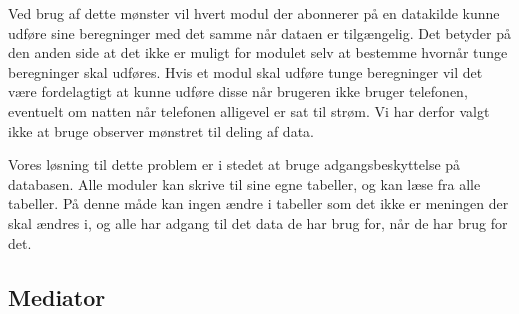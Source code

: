 Ved brug af dette mønster vil hvert modul der abonnerer på en datakilde kunne udføre sine beregninger med det samme når dataen er tilgængelig.
Det betyder på den anden side at det ikke er muligt for modulet selv at bestemme hvornår tunge beregninger skal udføres.
Hvis et modul skal udføre tunge beregninger vil det være fordelagtigt at kunne udføre disse når brugeren ikke bruger telefonen, eventuelt om natten når telefonen alligevel er sat til strøm.
Vi har derfor valgt ikke at bruge observer mønstret til deling af data.




Vores løsning til dette problem er i stedet at bruge adgangsbeskyttelse på databasen.
Alle moduler kan skrive til sine egne tabeller, og kan læse fra alle tabeller.
På denne måde kan ingen ændre i tabeller som det ikke er meningen der skal ændres i, og alle har adgang til det data de har brug for, når de har brug for det.

\subsection{Mediator}